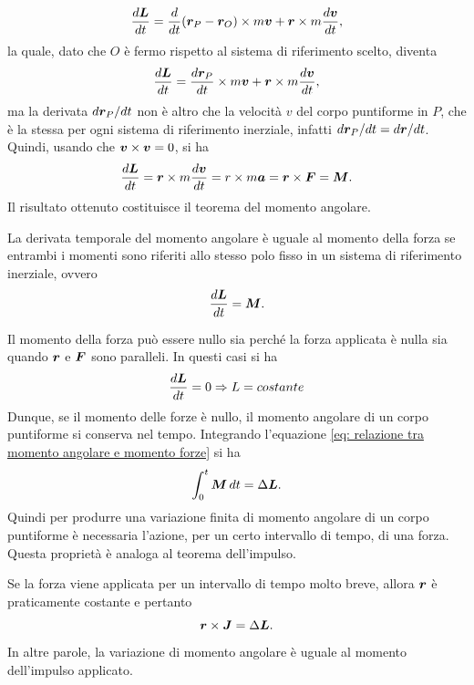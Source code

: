 \begin{equation}
    \frac{d\bm{L}}{dt}=\frac{d}{dt}(\bm{r}_P-\bm{r}_O)\times m\bm{v}+\bm{r}\times m\frac{d\bm{v}}{dt},
\end{equation}
la quale, dato che $O$ è fermo rispetto al sistema di riferimento scelto, diventa
\begin{equation}
    \frac{d\bm{L}}{dt}=\frac{d\bm{r}_P}{dt}\times m\bm{v}+\bm{r}\times m\frac{d\bm{v}}{dt},
\end{equation}
ma la derivata $d\bm{r}_P/dt$ non è altro che la velocità $v$ del corpo puntiforme in $P$, che è la stessa per ogni sistema di riferimento inerziale, infatti $d\bm{r}_P/dt=d\bm{r}/dt$. Quindi, usando che $\bm{v}\times \bm{v}=0$, si ha
\begin{equation}
    \frac{d\bm{L}}{dt}=\bm{r}\times m\frac{d\bm{v}}{dt}=r\times m\bm{a}=\bm{r}\times\bm{F}=\bm{M}.
\end{equation}
Il risultato ottenuto costituisce il teorema del momento angolare.
\begin{teo}
    La derivata temporale del momento angolare è uguale al momento della forza se entrambi i momenti sono riferiti allo stesso polo fisso in un sistema di riferimento inerziale, ovvero
    \begin{equation}
    \label{eq: relazione tra momento angolare e momento forze}
        \frac{d\bm{L}}{dt}=\bm{M}.
    \end{equation}
\end{teo}
Il momento della forza può essere nullo sia perché la forza applicata è nulla sia quando $\bm{r}$ e $\bm{F}$ sono paralleli. In questi casi si ha
\begin{equation}
    \frac{d\bm{L}}{dt}=0\Rightarrow L=costante
\end{equation}
Dunque, se il momento delle forze è nullo, il momento angolare di un corpo puntiforme si conserva nel tempo. Integrando l'equazione \eqref{eq: relazione tra momento angolare e momento forze} si ha
\begin{equation}
    \int_0^t\bm{M}\,dt=\Delta\bm{L}.
\end{equation}
Quindi per produrre una variazione finita di momento angolare di un corpo puntiforme è necessaria l'azione, per un certo intervallo di tempo, di una forza. Questa proprietà è analoga al teorema dell'impulso. 
\begin{teo}
    Se la forza viene applicata per un intervallo di tempo molto breve, allora $\bm{r}$ è praticamente costante e pertanto 
\begin{equation}
    \bm{r}\times\bm{J}=\Delta \bm{L}.
\end{equation}
In altre parole, la variazione di momento angolare è uguale al momento dell'impulso applicato.
\end{teo}
